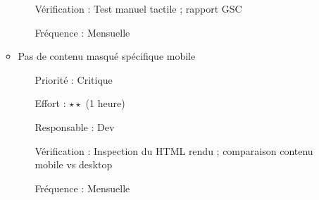 \documentclass[12pt,a4paper,twoside]{report}
\begin{document}
\begin{enumerate}
\begin{itemize}
\begin{itemize}
            \item[Vérification :] Test manuel tactile ; rapport GSC
            \item[Fréquence :] Mensuelle
        \end{itemize}
        \item Pas de contenu masqué spécifique mobile
        \begin{itemize}
            \item[Priorité :] Critique
            \item[Effort :] $\star\star$ (1 heure)
            \item[Responsable :] Dev
            \item[Vérification :] Inspection du HTML rendu ; comparaison contenu mobile vs desktop
            \item[Fréquence :] Mensuelle
        \end{itemize}
    \end{itemize}


\end{enumerate}
\end{document}
